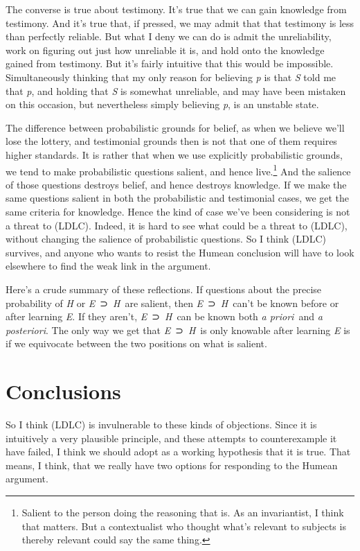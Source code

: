 \documentclass[
  10pt,
  letterpaper,
  DIV=11,
  numbers=noendperiod,
  twoside]{scrartcl}
\begin{document}
The converse is true about testimony. It's true that we can gain
knowledge from testimony. And it's true that, if pressed, we may admit
that that testimony is less than perfectly reliable. But what I deny we
can do is admit the unreliability, work on figuring out just how
unreliable it is, and hold onto the knowledge gained from testimony. But
it's fairly intuitive that this would be impossible. Simultaneously
thinking that my only reason for believing \emph{p} is that \emph{S}
told me that \emph{p}, and holding that \emph{S} is somewhat unreliable,
and may have been mistaken on this occasion, but nevertheless simply
believing \emph{p}, is an unstable state.

The difference between probabilistic grounds for belief, as when we
believe we'll lose the lottery, and testimonial grounds then is not that
one of them requires higher standards. It is rather that when we use
explicitly probabilistic grounds, we tend to make probabilistic
questions salient, and hence live.\footnote{Salient to the person doing
  the reasoning that is. As an invariantist, I think that matters. But a
  contextualist who thought what's relevant to subjects is thereby
  relevant could say the same thing.} And the salience of those
questions destroys belief, and hence destroys knowledge. If we make the
same questions salient in both the probabilistic and testimonial cases,
we get the same criteria for knowledge. Hence the kind of case we've
been considering is not a threat to (LDLC). Indeed, it is hard to see
what could be a threat to (LDLC), without changing the salience of
probabilistic questions. So I think (LDLC) survives, and anyone who
wants to resist the Humean conclusion will have to look elsewhere to
find the weak link in the argument.

Here's a crude summary of these reflections. If questions about the
precise probability of \emph{H} or \emph{E}~⊃~\emph{H}~are salient, then
\emph{E}~⊃~\emph{H}~can't be known before or after learning \emph{E}. If
they aren't, \emph{E}~⊃~\emph{H}~can be known both \emph{a priori}~and
\emph{a posteriori}. The only way we get that \emph{E}~⊃~\emph{H}~is
only knowable after learning \emph{E} is if we equivocate between the
two positions on what is salient.

\section{Conclusions}\label{conclusions}

So I think (LDLC) is invulnerable to these kinds of objections. Since it
is intuitively a very plausible principle, and these attempts to
counterexample it have failed, I think we should adopt as a working
hypothesis that it is true. That means, I think, that we really have two
options for responding to the Humean argument.
\end{document}
